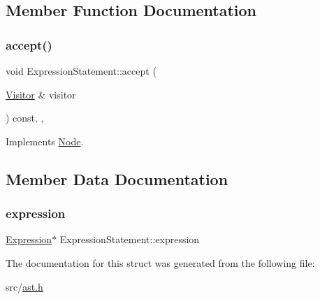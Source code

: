 \subsection{Member Function Documentation}
\mbox{\label{struct_expression_statement_a6463f779ec4140b2510d854726aefd40}} 
\subsubsection{\texorpdfstring{accept()}{accept()}}
{\footnotesize\ttfamily void Expression\+Statement\+::accept (\begin{DoxyParamCaption}\item[{\hyperlink{struct_visitor}{Visitor} \&}]{visitor }\end{DoxyParamCaption}) const\hspace{0.3cm}{\ttfamily [inline]}, {\ttfamily [override]}, {\ttfamily [virtual]}}



Implements \hyperlink{struct_node_a10bd7af968140bbf5fa461298a969c71}{Node}.



\subsection{Member Data Documentation}
\mbox{\label{struct_expression_statement_af8fa751297f7dd719ebe74d62201fc3a}} 
\subsubsection{\texorpdfstring{expression}{expression}}
{\footnotesize\ttfamily \hyperlink{struct_expression}{Expression}$\ast$ Expression\+Statement\+::expression}



The documentation for this struct was generated from the following file\+:\begin{DoxyCompactItemize}
\item 
src/\hyperlink{ast_8h}{ast.\+h}\end{DoxyCompactItemize}
